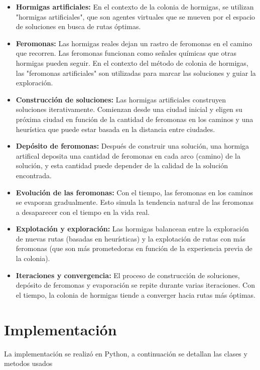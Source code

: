 \documentclass[]{report}
\begin{document}
	\begin{itemize}
		\item \textbf{Hormigas artificiales:} En el contexto de la colonia de hormigas, se utilizan "hormigas artificiales", que son agentes virtuales que se mueven por el espacio de soluciones en busca de rutas óptimas.
		\item \textbf{Feromonas:} Las hormigas reales dejan un rastro de feromonas en el camino que recorren. Las feromonas funcionan como señales químicas que otras hormigas pueden seguir. En el contexto del método de colonia de hormigas, las "feromonas artificiales" son utilizadas para marcar las soluciones y guiar la exploración.
		\item \textbf{Construcción de soluciones:} Las hormigas artificiales construyen soluciones iterativamente. Comienzan desde una ciudad inicial y eligen su próxima ciudad en función de la cantidad de feromonas en los caminos y una heurística que puede estar basada en la distancia entre ciudades.
		\item \textbf{Depósito de feromonas:} Después de construir una solución, una hormiga artifical deposita una cantidad de feromonas en cada arco (camino) de la solución, y esta cantidad puede depender de la calidad de la solución encontrada.
		\item \textbf{Evolución de las feromonas:} Con el tiempo, las feromonas en los caminos se evaporan gradualmente. Esto simula la tendencia natural de las feromonas a desaparecer con el tiempo en la vida real.
		\item
		\textbf{Explotación y exploración:} Las hormigas balancean entre la exploración de nuevas rutas (basadas en heurísticas) y la explotación de rutas con más feromonas (que son más prometedoras en función de la experiencia previa de la colonia).
		\item
		\textbf{Iteraciones y convergencia:} El proceso de construcción de soluciones, depósito de feromonas y evaporación se repite durante varias iteraciones. Con el tiempo, la colonia de hormigas tiende a converger hacia rutas más óptimas.
	\end{itemize}	
	\section{Implementación}
	La implementación se realizó en Python, a continuación se detallan las clases y metodos usados
		
\end{document}
